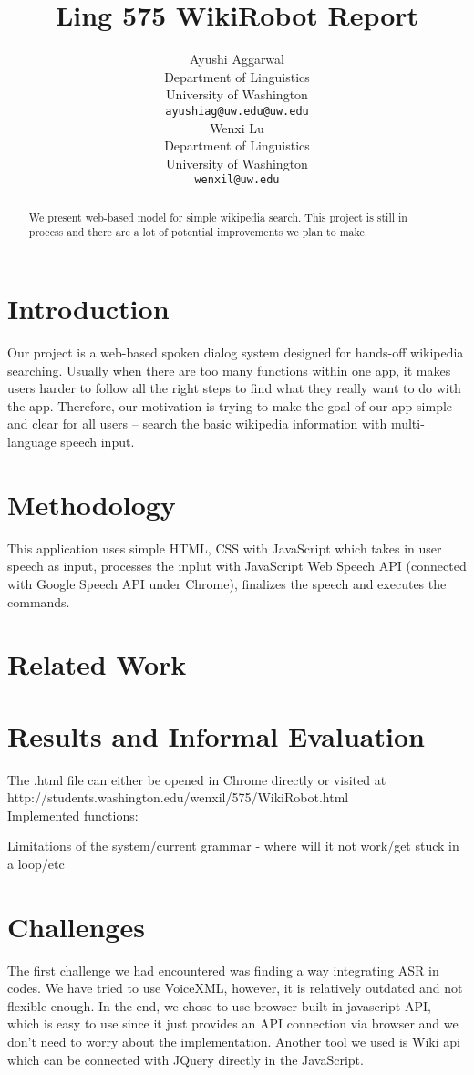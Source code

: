 \documentclass[11pt,a4paper]{article}
\title{Ling 575 WikiRobot Report}
\author{Ayushi Aggarwal\\
  Department of Linguistics \\
  University of Washington \\
  {\tt ayushiag@uw.edu@uw.edu} \\\And
  Wenxi Lu \\
  Department of Linguistics \\
  University of Washington \\
  {\tt wenxil@uw.edu} \\}
\date{}
\begin{document}
\maketitle

\begin{abstract}
We present web-based model for simple wikipedia search.
This project is still in process and there are a lot of potential improvements we plan to make. 
\end{abstract}



\section{Introduction}
Our project is a web-based spoken dialog system designed for hands-off wikipedia searching. Usually when there are too many functions within one app, it makes users harder to follow all the right steps to find what they really want to do with the app. Therefore, our motivation is trying to make the goal of our app simple and clear for all users -- search the basic wikipedia information with multi-language speech input.

\section{Methodology}
This application uses simple HTML, CSS with JavaScript which takes in user speech as input, processes the inplut with JavaScript Web Speech API (connected with Google Speech API under Chrome), finalizes the speech and executes the commands. 

\section{Related Work}



\section{Results and Informal Evaluation}
The .html file can either be opened in Chrome directly or visited at \\
http://students.washington.edu/wenxil/575/WikiRobot.html \\
Implemented functions: 

Limitations of the system/current grammar - where will it not work/get stuck in a loop/etc

\section{Challenges}
The first challenge we had encountered was finding a way integrating ASR in codes. We have tried to use VoiceXML, however, it is relatively outdated and not flexible enough. In the end, we chose to use browser built-in javascript API, which is easy to use since it just provides an API connection via browser and we don’t need to worry about the implementation. Another tool we used is Wiki api which can be connected with JQuery directly in the JavaScript. 
\end{document}
